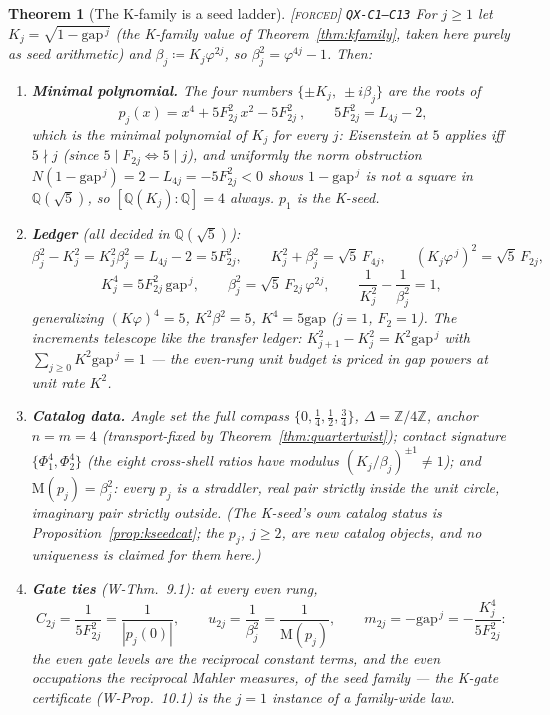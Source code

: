 \documentclass[11pt]{article}
\newcommand{\tagF}{\textcolor{cF}{\textsc{[forced]}}}
\newcommand{\hx}[1]{\textcolor{cC}{\footnotesize\texttt{#1}}}
\newcommand{\Q}{\mathbb{Q}}
\newcommand{\Z}{\mathbb{Z}}
\newcommand{\gp}{\varphi}
\newcommand{\gapc}{\mathrm{gap}}
\newcommand{\M}{\mathrm{M}}
\theoremstyle{plain}
\newtheorem{theorem}{Theorem}[section]
\theoremstyle{definition}
\theoremstyle{remark}
\begin{document}
\begin{theorem}[The K-family is a seed ladder]\label{thm:kseedladder}\tagF{} \hx{QX-C1--C13}
For $j\ge1$ let $K_j=\sqrt{1-\gapc^{\,j}}$ (the K-family value of
Theorem~\ref{thm:kfamily}, taken here purely as seed arithmetic) and
$\beta_j\coloneqq K_j\gp^{2j}$, so $\beta_j^2=\gp^{4j}-1$. Then:
\begin{enumerate}[nosep,label=(\alph*)]
\item \textbf{Minimal polynomial.} The four numbers
$\{\pm K_j,\ \pm i\beta_j\}$ are the roots of
\[
\boxed{\ p_j(x)=x^4+5F_{2j}^2\,x^2-5F_{2j}^2\ },
\qquad 5F_{2j}^2=L_{4j}-2 ,
\]
which is the minimal polynomial of $K_j$ for \emph{every} $j$: Eisenstein
at $5$ applies iff $5\nmid j$ (since $5\mid F_{2j}\iff5\mid j$), and
uniformly the norm obstruction
$N(1-\gapc^{\,j})=2-L_{4j}=-5F_{2j}^2<0$ shows $1-\gapc^{\,j}$ is not a
square in $\Q(\sqrt5)$, so $[\Q(K_j):\Q]=4$ always. $p_1$ is the K-seed.
\item \textbf{Ledger} (all decided in $\Q(\sqrt5)$):
\[
\beta_j^2-K_j^2 = K_j^2\beta_j^2 = L_{4j}-2 = 5F_{2j}^2,
\qquad
K_j^2+\beta_j^2=\sqrt5\,F_{4j},
\qquad
(K_j\gp^{\,j})^2=\sqrt5\,F_{2j},
\]
\[
K_j^4=5F_{2j}^2\,\gapc^{\,j},
\qquad
\beta_j^2=\sqrt5\,F_{2j}\,\gp^{2j},
\qquad
\frac1{K_j^2}-\frac1{\beta_j^2}=1 ,
\]
generalizing $(K\gp)^4=5$, $K^2\beta^2=5$, $K^4=5\gapc$ ($j=1$, $F_2=1$).
The increments telescope like the transfer ledger:
$K_{j+1}^2-K_j^2=K^2\gapc^{\,j}$ with $\sum_{j\ge0}K^2\gapc^{\,j}=1$ ---
the even-rung unit budget is priced in gap powers at unit rate $K^2$.
\item \textbf{Catalog data.} Angle set the full compass
$\{0,\tfrac14,\tfrac12,\tfrac34\}$, $\Delta=\Z/4\Z$, anchor $n=m=4$
(transport-fixed by Theorem~\ref{thm:quartertwist}); contact signature
$\{\Phi_1^4,\Phi_2^4\}$ (the eight cross-shell ratios have modulus
$(K_j/\beta_j)^{\pm1}\ne1$); and $\M(p_j)=\beta_j^2$: every $p_j$ is a
straddler, real pair strictly inside the unit circle, imaginary pair
strictly outside. (The K-seed's own catalog status is
Proposition~\ref{prop:kseedcat}; the $p_j$, $j\ge2$, are new catalog
objects, and no uniqueness is claimed for them here.)
\item \textbf{Gate ties} (W-Thm.\ 9.1): at every even rung,
\[
C_{2j}=\frac1{5F_{2j}^2}=\frac1{|p_j(0)|},
\qquad
u_{2j}=\frac1{\beta_j^2}=\frac1{\M(p_j)},
\qquad
m_{2j}=-\gapc^{\,j}=-\frac{K_j^4}{5F_{2j}^2}:
\]
the even gate levels are the reciprocal constant terms, and the even
occupations the reciprocal Mahler measures, of the seed family --- the
K-gate certificate (W-Prop.\ 10.1) is the $j=1$ instance of a family-wide
law.
\end{enumerate}
\end{theorem}
\end{document}
